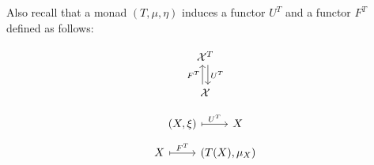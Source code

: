 Also recall that a monad $(T,\mu,\eta)$ induces a functor $U^T$ and a functor $F^T$ defined as follows:

\begin{minipage}{0.5\textwidth}
    \[
\begin{tikzcd}
\mathcal{X}^T \arrow[d, "U^T", shift left] \\
\mathcal{X} \arrow[u, "F^T", shift left]  
\end{tikzcd}
    \]
\end{minipage}
\begin{minipage}{0.2\textwidth}
\[
\begin{tikzcd}
{(X,\xi)} \arrow[r, "U^T", maps to] & X
\end{tikzcd}
\]
\[
\begin{tikzcd}
X \arrow[r, "F^T", maps to] & {(T(X),\mu_X)}
\end{tikzcd}
\]
\end{minipage}

